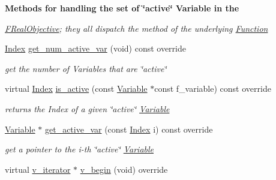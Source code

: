 \begin{Indent}\textbf{ Methods for handling the set of \char`\"{}active\char`\"{} Variable in the}\par
{\em \mbox{\hyperlink{class_s_m_spp__di__unipi__it_1_1_f_real_objective}{F\+Real\+Objective}}; they all dispatch the method of the underlying \mbox{\hyperlink{class_s_m_spp__di__unipi__it_1_1_function}{Function}} }\begin{DoxyCompactItemize}
\item 
\mbox{\hyperlink{group___thin_var_dep_interface___c_l_a_s_s_e_s_gad53d6229d7ec28555a9c9c2fd9abf773}{Index}} \mbox{\hyperlink{class_s_m_spp__di__unipi__it_1_1_f_real_objective_acc8ac3c57cc2c71ac3fe6c409fe53074}{get\+\_\+num\+\_\+active\+\_\+var}} (void) const override
\begin{DoxyCompactList}\small\item\em get the number of Variables that are \char`\"{}active\char`\"{} \end{DoxyCompactList}\item 
virtual \mbox{\hyperlink{group___thin_var_dep_interface___c_l_a_s_s_e_s_gad53d6229d7ec28555a9c9c2fd9abf773}{Index}} \mbox{\hyperlink{class_s_m_spp__di__unipi__it_1_1_f_real_objective_ae2efd3cdf1d4fd41cbafda3c49facfa5}{is\+\_\+active}} (const \mbox{\hyperlink{class_s_m_spp__di__unipi__it_1_1_variable}{Variable}} $\ast$const f\+\_\+variable) const override
\begin{DoxyCompactList}\small\item\em returns the Index of a given \char`\"{}active\char`\"{} \mbox{\hyperlink{class_s_m_spp__di__unipi__it_1_1_variable}{Variable}} \end{DoxyCompactList}\item 
\mbox{\hyperlink{class_s_m_spp__di__unipi__it_1_1_variable}{Variable}} $\ast$ \mbox{\hyperlink{class_s_m_spp__di__unipi__it_1_1_f_real_objective_a1ba10c2bdb196783fa32ab9cae079203}{get\+\_\+active\+\_\+var}} (const \mbox{\hyperlink{group___thin_var_dep_interface___c_l_a_s_s_e_s_gad53d6229d7ec28555a9c9c2fd9abf773}{Index}} i) const override
\begin{DoxyCompactList}\small\item\em get a pointer to the i-\/th \char`\"{}active\char`\"{} \mbox{\hyperlink{class_s_m_spp__di__unipi__it_1_1_variable}{Variable}} \end{DoxyCompactList}\item 
virtual \mbox{\hyperlink{class_s_m_spp__di__unipi__it_1_1_thin_var_dep_interface_1_1v__iterator}{v\+\_\+iterator}} $\ast$ \mbox{\hyperlink{class_s_m_spp__di__unipi__it_1_1_f_real_objective_ad0b5bcf42a678385fdba6fe41ce9626b}{v\+\_\+begin}} (void) override

\end{DoxyCompactItemize}
\end{Indent}
